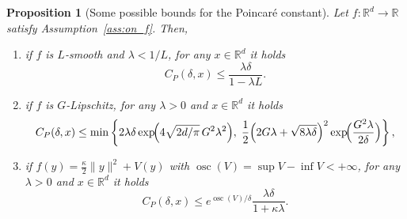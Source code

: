 \documentclass{article}
\newtheorem{proposition}{Proposition}
\newcommand{\R}{\mathbb{R}}
\newcommand{\osc}{\ensuremath{\operatorname{osc}}}
\begin{document}
\begin{proposition}[Some possible bounds for the Poincaré constant]\label{prop:bounds_on_poincare}
Let $f:\R^d\to \R$ satisfy Assumption~\ref{ass:on_f}. Then, 
    \begin{enumerate}
        \item[(i)] if $f$ is $L$-smooth and $\lambda < 1/L$, for any $x\in \R^d$ it holds
        \[C_P(\delta, x) \leq \frac{\lambda\delta}{1-\lambda L}.\]
        \item[(ii)] if $f$ is $G$-Lipschitz, for any $\lambda >0$ and $x\in \R^d$ it holds
\[
C_P(\delta,x)\le
\min\left\{
2\lambda\delta \exp\!\Bigl(4\sqrt{2d/\pi}\,G^2\lambda^2\Bigr),\;
\frac12\Bigl(2G\lambda+\sqrt{8\lambda\delta}\Bigr)^2
\exp\!\Bigl(\frac{G^2\lambda}{2\delta}\Bigr)
\right\},
\]
\item[(iii)] if $f(y)=\frac{\kappa}{2}\|y\|^2+V(y)$ with $\operatorname{osc}(V)= \sup V - \inf V <+\infty$, for any $\lambda>0$ and $x\in \R^d$ it holds
\[
C_P(\delta,x)\leq e^{\osc(V)/\delta}
\frac{\lambda\delta}{1+\kappa\lambda}.
\]
    \end{enumerate}
\end{proposition}
\end{document}
